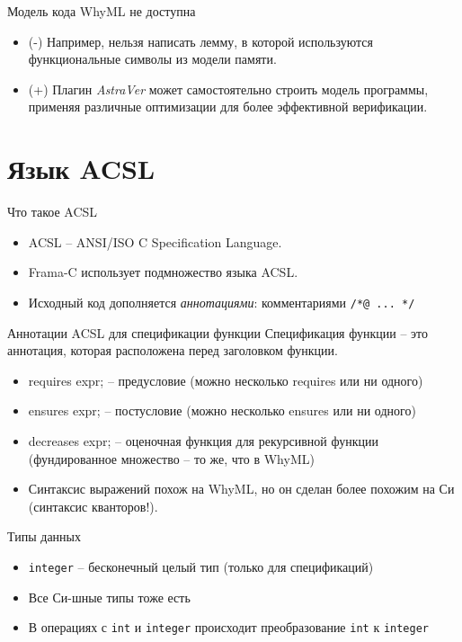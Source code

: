 \documentclass[hyperref={unicode=true}]{beamer}
\begin{document}
    \begin{frame}{Модель кода WhyML не доступна}
    \begin{itemize}
    \item (-) Например, нельзя написать лемму, в которой
    используются функциональные символы из модели памяти.
    \item (+) Плагин \textsl{AstraVer} может самостоятельно
    строить модель программы, применяя различные
    оптимизации для более эффективной верификации.
    \end{itemize}
    \end{frame}

    \section{Язык ACSL}

    \begin{frame}{Что такое ACSL}
    \begin{itemize}
    \item
    ACSL -- ANSI/ISO C Specification Language.
    \item
    Frama-C использует подмножество языка ACSL.
    \item
    Исходный код дополняется \emph{аннотациями}:
    комментариями \texttt{/*@ ... */}
    \end{itemize}
    \end{frame}

    \begin{frame}{Аннотации ACSL для спецификации функции}
    Спецификация функции -- это аннотация, которая
    расположена перед заголовком функции.
    \begin{itemize}
    \item
    requires expr; -- предусловие (можно несколько requires или ни одного)
    \item
    ensures expr; -- постусловие (можно несколько ensures или ни одного)
    \item
    decreases expr; -- оценочная функция для рекурсивной функции
    (фундированное множество -- то же, что в WhyML)
    \item
    Синтаксис выражений похож на WhyML, но он сделан более
    похожим на Си (синтаксис кванторов!).
    \end{itemize}
    \end{frame}

    \begin{frame}{Типы данных}
    \begin{itemize}
    \item
    \texttt{integer} -- бесконечный целый тип (только для спецификаций)
    \item
    Все Си-шные типы тоже есть
    \item
    В операциях с \texttt{int} и \texttt{integer} происходит преобразование
    \texttt{int} к \texttt{integer}
    \end{itemize}
    \end{frame}
\end{document}
